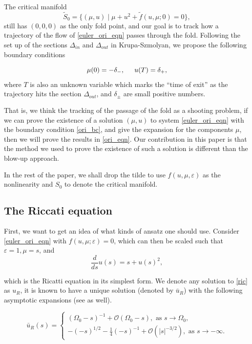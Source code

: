 \documentclass[letterpaper,11pt]{article}
\newcommand{\rmO}{\mathcal{O}}
\newcommand{\eps}{\varepsilon}
\numberwithin{equation}{section}
\theoremstyle{plain}
\begin{document}
The critical manifold 
\[
\tilde{S}_0 = \{ (\mu, u) \mid \mu + u^2 + \tilde{f}(u,\mu;0) = 0\},
\]
still has $(0,0,0)$ as the only fold point, and our goal is to track how a trajectory of the flow of \eqref{euler_ori_eqn} passes through the fold. Following the set up of the sections $\Delta_{in}$ and $\Delta_{out}$ in Krupa-Szmolyan, we propose the following boundary conditions

\begin{equation}\label{ori_bc}
\mu(0) = -\delta_-, \hspace{0.2in} u(T) = \delta_+,
\end{equation}
where $T$ is also an unknown variable which marks the ``time of exit'' as the trajectory hits the section $\Delta_{out}$, and $\delta_{\pm}$ are small positive numbers.

That is, we think the tracking of the passage of the fold as a shooting problem, if we can prove the existence of a solution $(\mu, u)$ to system \eqref{euler_ori_eqn} with the boundary condition \eqref{ori_bc}, and give the expansion for the components $\mu$, then we will prove the results in \eqref{ori_eqn}. Our contribution in this paper is that the method we used to prove the existence of such a solution is different than the blow-up approach.

In the rest of the paper, we shall drop the tilde to use $f(u,\mu,\eps)$ as the nonlinearity and $S_0$ to denote the critical manifold.



\subsection{The Riccati equation}\label{Ric_def}
First, we want to get an idea of what kinds of ansatz one should use. Consider \eqref{euler_ori_eqn} with $f(u,\mu;\eps) = 0$, which can then be scaled such that $\eps = 1, \mu = s$, and 
\begin{equation}\label{ric}
\frac{d}{ds}u(s) = s+u(s)^2,
\end{equation}

which is the Ricatti equation in its simplest form. We denote any solution to \eqref{ric} as $u_R$, it is known to have a unique solution (denoted by $\bar{u}_R$) with the following asymptotic expansions (see \cite{KrupaSz} as well).

\begin{equation} \label{ric_asy}
\bar{u}_R(s)=\begin{cases}
  (\Omega_0-s)^{-1}+\rmO(\Omega_0-s), \text{ as }s \to \Omega_0, \\
 -(-s)^{1/2} -\frac{1}{4}(-s)^{-1} + \rmO(|s|^{-3/2}), \text{ as }s \to -\infty.
\end{cases}
\end{equation}
\end{document}
